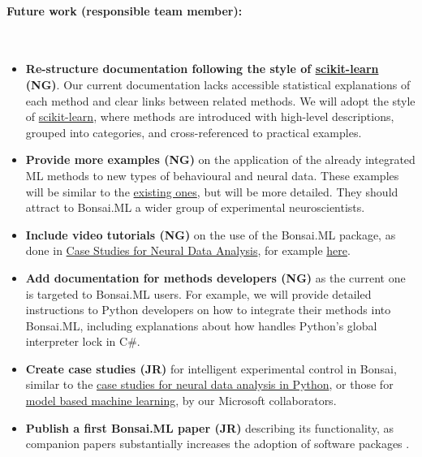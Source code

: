 \paragraph{Future work (responsible team member):}\mbox{}\\
\begin{itemize}

    \item \textbf{Re-structure documentation following the style of
        \href{https://scikit-learn.org/}{scikit-learn} (NG)}. Our current
        documentation lacks accessible statistical explanations of each method
        and clear links between related methods.  We will adopt the style of
        \href{https://scikit-learn.org/}{scikit-learn}, where methods are
        introduced with high-level descriptions, grouped into categories, and
        cross-referenced to practical examples.

    \item\textbf{Provide more examples (NG)} on the application of the already
        integrated ML methods to new types of behavioural and neural data.
        These examples will be similar to the
        \href{https://bonsai-rx.org/machinelearning/examples/README.html}{existing
        ones}, but will be more detailed.
        They should attract to Bonsai.ML a wider group of experimental
        neuroscientists.

    \item\textbf{Include video tutorials (NG)} on the use of the Bonsai.ML
        package, as done in
        \href{https://mark-kramer.github.io/Case-Studies-Python}{Case Studies
        for Neural Data Analysis}, for example
        \href{https://youtu.be/Oj9e2bB3BfI}{here}.

    \item\textbf{Add documentation for methods developers (NG)} as the current
        one is targeted to Bonsai.ML users. For example, we will provide
        detailed instructions to Python developers on how to integrate their
        methods into Bonsai.ML, including explanations about how handles
        Python's global interpreter lock in C\#.

    \item\textbf{Create case studies (JR)} for intelligent experimental control
        in Bonsai, similar to the
        \href{https://mark-kramer.github.io/Case-Studies-Python/intro.html}{case
        studies for neural data analysis in Python}, or those for
        \href{https://mbmlbook.com/index.html}{model based machine learning},
        by our Microsoft collaborators.

    \item\textbf{Publish a first Bonsai.ML paper (JR)} describing its functionality, as
        companion papers substantially increases the adoption of software
        packages \citep{lopesEtAl15,guilbeaultEtAl21}.

\end{itemize}


